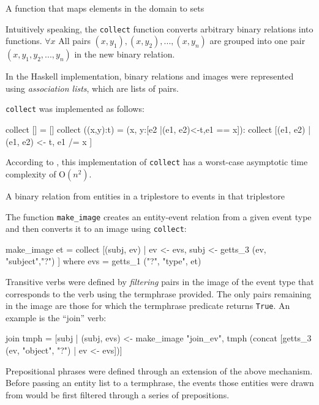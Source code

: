 \documentclass[../main.tex]{subfiles}
\begin{document}
\begin{definition}[Image]
  A function that maps elements in the domain to sets
\end{definition}

Intuitively speaking, the \texttt{collect} function converts arbitrary binary
relations into functions.  $\forall x$ All pairs $(x, y_1), (x, y_2), ..., (x,
y_n)$ are grouped into one pair $(x, {y_1, y_2, ..., y_n})$ in the new binary
relation.

In the Haskell implementation, binary relations and images were represented using {\em association
lists}, which are lists of pairs\cite{frost2014denotational}.

\texttt{collect} was implemented as follows:

\begin{code}
collect [] = []
collect ((x,y):t) = (x, y:[e2 |(e1, e2)<-t,e1 == x]): collect [(e1, e2) | (e1, e2) <- t, e1 /= x ]
\end{code}

According to \cite{agboola2015extensible}, this implementation of \texttt{collect} has a worst-case asymptotic time complexity of
O$(n^2)$.

\begin{definition}
  A binary relation from entities in a triplestore to events in that triplestore
\end{definition}

The function \texttt{make\_image} creates an entity-event relation from a given event type and then converts it to an image using \texttt{collect}:

\begin{code}
  make_image et = collect [(subj, ev) | ev <- evs, subj <- getts_3 (ev, "subject","?") ]
    where evs = getts_1 ("?", "type",  et)
\end{code}

Transitive verbs were defined by {\em filtering} pairs in the image of the event
type that corresponds to the verb using the termphrase provided.  The only pairs remaining in the image are those
for which the termphrase predicate returns \texttt{True}.  An example is the
``join'' verb:

\begin{code}
  join tmph = [subj | (subj, evs) <- make_image "join_ev",
       tmph (concat [getts_3 (ev,  "object", "?") | ev <- evs])]
\end{code}

Prepositional phrases were defined through an extension of the above
mechanism.  Before passing an entity list to a termphrase, the events
those entities were drawn from would be first filtered through a series
of prepositions.
\end{document}
